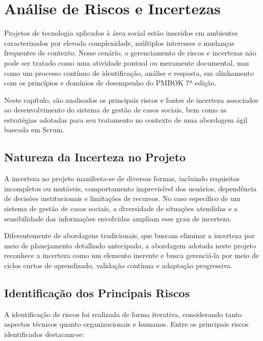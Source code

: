 \chapter{Análise de Riscos e Incertezas}\label{chp:RiscosIncertezas}

Projetos de tecnologia aplicados à área social estão inseridos em ambientes caracterizados por elevada complexidade, múltiplos interesses e mudanças frequentes de contexto. Nesse cenário, o gerenciamento de riscos e incertezas não pode ser tratado como uma atividade pontual ou meramente documental, mas como um processo contínuo de identificação, análise e resposta, em alinhamento com os princípios e domínios de desempenho do PMBOK 7ª edição.

Neste capítulo, são analisados os principais riscos e fontes de incerteza associados ao desenvolvimento do sistema de gestão de casos sociais, bem como as estratégias adotadas para seu tratamento no contexto de uma abordagem ágil baseada em Scrum.

\section{Natureza da Incerteza no Projeto}

A incerteza no projeto manifesta-se de diversas formas, incluindo requisitos incompletos ou mutáveis, comportamento imprevisível dos usuários, dependência de decisões institucionais e limitações de recursos. No caso específico de um sistema de gestão de casos sociais, a diversidade de situações atendidas e a sensibilidade das informações envolvidas ampliam esse grau de incerteza.

Diferentemente de abordagens tradicionais, que buscam eliminar a incerteza por meio de planejamento detalhado antecipado, a abordagem adotada neste projeto reconhece a incerteza como um elemento inerente e busca gerenciá-la por meio de ciclos curtos de aprendizado, validação contínua e adaptação progressiva.

\section{Identificação dos Principais Riscos}

A identificação de riscos foi realizada de forma iterativa, considerando tanto aspectos técnicos quanto organizacionais e humanos. Entre os principais riscos identificados destacam-se:

